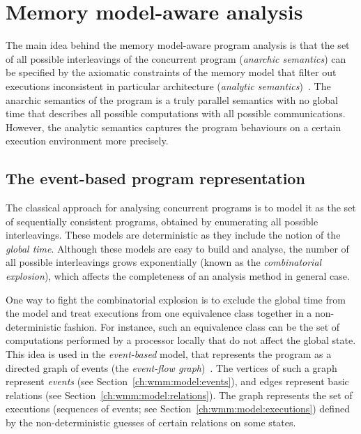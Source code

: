 \chapter{Memory model-aware analysis}
\label{ch:wmm}

The main idea behind the memory model-aware program analysis is that the set of all possible interleavings of the concurrent program (\textit{anarchic semantics}) can be specified by the axiomatic constraints of the memory model that filter out executions inconsistent in particular architecture (\textit{analytic semantics})~\cite{alglave2016syntax}.
The anarchic semantics of the program is a truly parallel semantics with no global time that describes all possible computations with all possible communications.
However, the analytic semantics captures the program behaviours on a certain execution environment more precisely.


\section{The event-based program representation}
\label{ch:wmm:event}

The classical approach for analysing concurrent programs is to model it as the set of sequentially consistent programs, obtained by enumerating all possible interleavings.
These models are deterministic as they include the notion of the \textit{global time}. %
Although these models are easy to build and analyse, the number of all possible interleavings grows exponentially (known as the \textit{combinatorial explosion}), which affects the completeness of an analysis method in general case.

One way to fight the combinatorial explosion is to exclude the global time from the model and treat executions from one equivalence class together in a non-deterministic fashion.
For instance, such an equivalence class can be the set of computations performed by a processor locally that do not affect the global state.
This idea is used in the \textit{event-based} model, that represents the program as a directed graph of events (the \textit{event-flow graph})~\cite{alglave2010shared}.
The vertices of such a graph represent \textit{events} (see Section~\ref{ch:wmm:model:events}), and edges represent basic relations (see Section~\ref{ch:wmm:model:relations}).
The graph represents the set of executions (sequences of events; see Section~\ref{ch:wmm:model:executions}) defined by the non-deterministic guesses of certain relations on some states.

